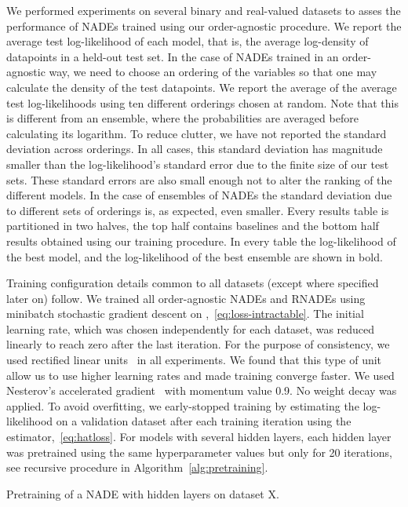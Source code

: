 \documentclass{article}
\begin{document}
We performed experiments on several binary and real-valued datasets to asses the
performance of NADEs trained using our order-agnostic procedure. We report the
average test log-likelihood of each model, that is, the average log-density of
datapoints in a held-out test set. In the case of NADEs trained in an
order-agnostic way, we need to choose an ordering of the variables so that one
may calculate the density of the test datapoints. We report the average of the
average test log-likelihoods using ten different orderings chosen
at random. Note that this is different from an ensemble, where the
probabilities are averaged before calculating its logarithm.
To reduce clutter,
we have not reported the standard deviation across orderings. In all cases,
this standard deviation has magnitude smaller than the log-likelihood's standard
error due to the finite size of our test sets. These standard errors are also
small enough not to alter the ranking of the different models. In the case of
ensembles of NADEs the standard deviation due to different sets of orderings is,
as expected, even smaller. Every results table is partitioned in two halves, the
top half contains baselines and the bottom half results obtained using our
training procedure. In every table the log-likelihood of the best model, and the
log-likelihood of the best ensemble are shown in bold.

Training configuration details common to all datasets (except where specified
later on) follow. We trained all order-agnostic NADEs and RNADEs using minibatch
stochastic gradient descent on ,~\eqref{eq:loss-intractable}. The initial
learning rate, which was chosen independently for each dataset, was reduced
linearly to reach zero after the last iteration. For the purpose of consistency,
we used rectified linear units~\cite{nair2010rectified} in all experiments. We
found that this type of unit allow us to use higher learning rates and made
training converge faster. We used Nesterov's accelerated gradient~\cite{Sutskever2013}
with momentum value 0.9. No weight decay was applied. To avoid
overfitting, we early-stopped training by estimating the log-likelihood on a
validation dataset after each training iteration using the 
estimator,~\eqref{eq:hatloss}. For models with several hidden layers, each
hidden layer was pretrained using the same hyperparameter values but
only for 20 iterations, see recursive procedure
in Algorithm~\ref{alg:pretraining}.
\begin{algorithm}
\begin{algorithmic}[1]
\caption{Pretraining of a NADE with  hidden layers on dataset X.}
\label{alg:pretraining}
  \If{}
    \State\Return{}
  \Else
    \State 
    \State 
    \State 
    \State 
    \State 
    \State \Return{}
  \EndIf
\EndProcedure
\end{algorithmic}
\end{algorithm}
\end{document}
